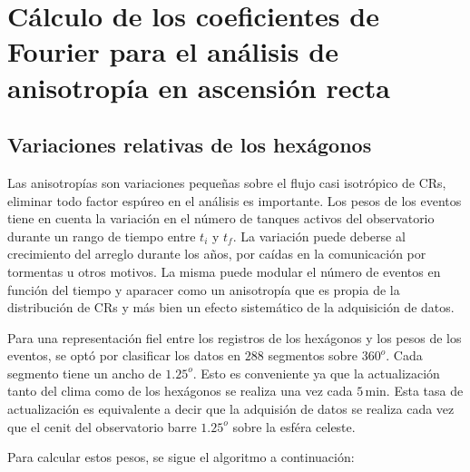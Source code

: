 
\section{Cálculo de los coeficientes de Fourier para el análisis de anisotropía en ascensión recta}

  \subsection{Variaciones relativas de los hexágonos} \label{peso_hexagonos}

    Las anisotropías son variaciones pequeñas sobre el flujo casi isotrópico de CRs, eliminar todo factor espúreo en el análisis es importante. Los pesos de los eventos tiene en cuenta la variación en el número de tanques activos del observatorio durante un rango de tiempo entre $t_{i}$ y $t_f$. La variación puede deberse al crecimiento del arreglo durante los años,  por caídas en la comunicación por tormentas u otros motivos. La misma puede modular el número de  eventos en función del tiempo y aparacer como un anisotropía que es propia  de la distribución de CRs y más bien un efecto sistemático de la adquisición de datos.

    Para una representación fiel entre los registros de los hexágonos y los pesos de los eventos, se optó por clasificar los datos en $288$ segmentos sobre $360^o$. Cada segmento tiene un ancho de $1.25^o$. Esto es conveniente ya que la actualización tanto del clima como de los hexágonos se realiza una vez  cada $5\,$min. Esta tasa de actualización es equivalente a decir que la adquisión de datos se realiza cada vez que el cenit del observatorio barre  $1.25^o$ sobre la esféra celeste.

    Para calcular estos pesos, se sigue el algoritmo a continuación:
     
